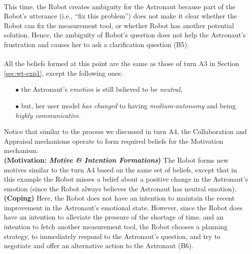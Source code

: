 \noindent{}\\

This time, the Robot creates ambiguity for the Astronaut because part of
the Robot's utterance (i.e., ``fix this problem'') does not make it clear
whether the Robot can fix the measurement tool, or whether Robot has another
potential solution. Hence, the ambiguity of Robot's question does not help the
Astronaut's frustration and causes her to ask a clarification question (B5).\\

\noindent{}\\

All the beliefs formed at this point are the same as those of turn A3 in Section
\ref{sec:wt-exp1}, except the following ones:

\begin{itemize}
  \item[$\bullet$] the Astronaut's \textit{emotion} is still
  believed to be \textit{neutral},
  \item[$\bullet$] but, her user model \textit{has changed} to having
  \textit{medium-autonomy} and being \textit{highly communicative}.
\end{itemize}

Notice that similar to the process we discussed in turn A4, the Collaboration
and Appraisal mechanisms operate to form required beliefs for the Motivation
mechanism.\\

\noindent\textbf{(Motivation: \textit{Motive \& Intention Formations})} The
Robot forms new motives similar to the turn A4 based on the same set of beliefs,
except that in this example the Robot misses a belief about a positive change in
the Astronaut's emotion (since the Robot always believes the Astronaut has
neutral emotion).\\

\noindent\textbf{(Coping)} Here, the Robot does not have an intention to
maintain the recent improvement in the Astronaut's emotional state. However,
since the Robot does have an intention to alleviate the pressure of the shortage
of time, and an intention to fetch another measurement tool, the Robot chooses a
planning strategy, to immediately respond to the Astronaut's question, and try
to negotiate and offer an alternative action to the Astronaut (B6).\\

